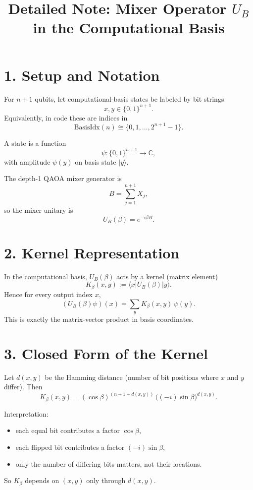 \documentclass[11pt]{article}
\title{Detailed Note: Mixer Operator $U_B$ in the Computational Basis}
\author{}
\date{}
\begin{document}
	\maketitle
	
	\section*{1. Setup and Notation}
	For $n+1$ qubits, let computational-basis states be labeled by bit strings
	\[
	x,y \in \{0,1\}^{n+1}.
	\]
	Equivalently, in code these are indices in
	\[
	\mathrm{BasisIdx}(n) \cong \{0,1,\dots,2^{n+1}-1\}.
	\]
	
	A state is a function
	\[
	\psi : \{0,1\}^{n+1} \to \mathbb{C},
	\]
	with amplitude $\psi(y)$ on basis state $|y\rangle$.
	
	The depth-1 QAOA mixer generator is
	\[
	B = \sum_{j=1}^{n+1} X_j,
	\]
	so the mixer unitary is
	\[
	U_B(\beta) = e^{-i\beta B}.
	\]
	
	\section*{2. Kernel Representation}
	In the computational basis, $U_B(\beta)$ acts by a kernel (matrix element)
	\[
	K_\beta(x,y) := \langle x|U_B(\beta)|y\rangle.
	\]
	Hence for every output index $x$,
	\begin{equation}
	(U_B(\beta)\psi)(x) = \sum_{y} K_\beta(x,y)\,\psi(y).
	\label{eq:kernel-action}
	\end{equation}
	This is exactly the matrix-vector product in basis coordinates.
	
	\section*{3. Closed Form of the Kernel}
	Let $d(x,y)$ be the Hamming distance (number of bit positions where $x$ and $y$ differ). Then
	\begin{equation}
	K_\beta(x,y)
	= (\cos\beta)^{(n+1-d(x,y))}\,\bigl((-i)\sin\beta\bigr)^{d(x,y)}.
	\label{eq:kernel-closed-form}
	\end{equation}
	
	Interpretation:
	\begin{itemize}
		\item each equal bit contributes a factor $\cos\beta$,
		\item each flipped bit contributes a factor $(-i)\sin\beta$,
		\item only the number of differing bits matters, not their locations.
	\end{itemize}
	So $K_\beta$ depends on $(x,y)$ only through $d(x,y)$.
	
\end{document}
